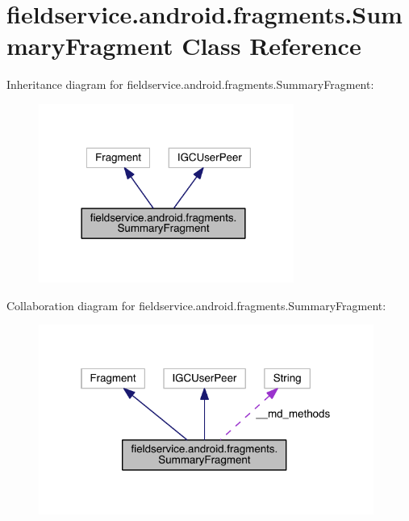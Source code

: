\hypertarget{classfieldservice_1_1android_1_1fragments_1_1_summary_fragment}{\section{fieldservice.\+android.\+fragments.\+Summary\+Fragment Class Reference}
\label{classfieldservice_1_1android_1_1fragments_1_1_summary_fragment}
}


Inheritance diagram for fieldservice.\+android.\+fragments.\+Summary\+Fragment\+:
\nopagebreak
\begin{figure}[H]
\begin{center}
\leavevmode
\includegraphics[width=237pt]{classfieldservice_1_1android_1_1fragments_1_1_summary_fragment__inherit__graph}
\end{center}
\end{figure}


Collaboration diagram for fieldservice.\+android.\+fragments.\+Summary\+Fragment\+:
\nopagebreak
\begin{figure}[H]
\begin{center}
\leavevmode
\includegraphics[width=311pt]{classfieldservice_1_1android_1_1fragments_1_1_summary_fragment__coll__graph}
\end{center}
\end{figure}
